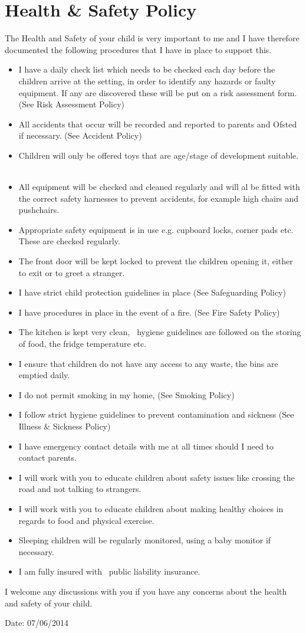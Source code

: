 \documentclass[10pt]{article}
\begin{document}
\section{Health \& Safety Policy}

The Health and Safety of your child is very important to me and I have
therefore documented the following procedures that I have in place to
support this.

\begin{itemize}
\item
  I have a daily check list which needs to be checked each day before
  the children arrive at the setting, in order to identify any hazards
  or faulty equipment. If any are discovered these will be put on a risk
  assessment form. (See Risk Assessment Policy)~
\item
  All accidents that occur will be recorded and reported to parents and
  Ofsted if necessary. (See Accident Policy)~
\item
  Children will only be offered toys that are age/stage of development
  suitable. ~
\item
  All equipment will be checked and cleaned regularly and will al be
  fitted with the correct safety harnesses to prevent accidents, for
  example high chairs and pushchairs. ~
\item
  Appropriate safety equipment is in use e.g. cupboard locks, corner
  pads etc. These are checked regularly.~
\item
  The front door will be kept locked to prevent the children opening
  it, either to exit or to greet a stranger.~
\item
  I have strict child protection guidelines in place (See Safeguarding
  Policy)~
\item
  I have procedures in place in the event of a fire. (See Fire Safety
  Policy)~
\item
  The kitchen is kept very clean, ~hygiene guidelines are followed on
  the storing of food, the fridge temperature etc. ~
\item
  I ensure that children do not have any access to any waste, the bins
  are emptied daily.~
\item
  I do not permit smoking in my home, (See Smoking Policy)~
\item
  I follow strict hygiene guidelines to prevent contamination and
  sickness (See Illness \& Sickness Policy)~
\item
  I have emergency contact details with me at all times should I need
  to contact parents.~
\item
  I will work with you to educate children about safety issues like
  crossing the road and not talking to strangers.~
\item
  I will work with you to educate children about making healthy choices
  in regards to food and physical exercise. ~
\item
  Sleeping children will be regularly monitored, using a baby monitor
  if necessary.~
\item
  I am fully insured with ~public liability insurance. ~
\end{itemize}

I welcome any discussions with you if you have any concerns about the
health and safety of your child.

Date: 07/06/2014

~
\end{document}
